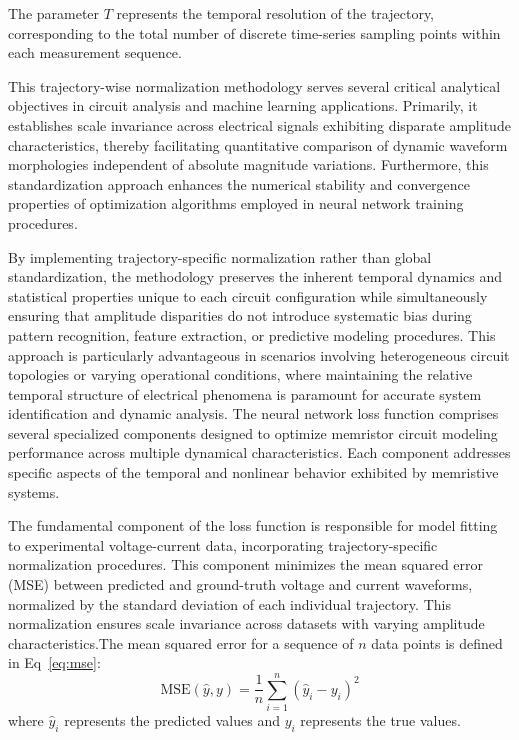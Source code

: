 \documentclass[11pt, oneside]{article}
\begin{document}
The parameter $T$ represents the temporal resolution of the trajectory, corresponding to the total number of discrete time-series sampling points within each measurement sequence.

This trajectory-wise normalization methodology serves several critical analytical objectives in circuit analysis and machine learning applications. Primarily, it establishes scale invariance across electrical signals exhibiting disparate amplitude characteristics, thereby facilitating quantitative comparison of dynamic waveform morphologies independent of absolute magnitude variations. Furthermore, this standardization approach enhances the numerical stability and convergence properties of optimization algorithms employed in neural network training procedures.

By implementing trajectory-specific normalization rather than global standardization, the methodology preserves the inherent temporal dynamics and statistical properties unique to each circuit configuration while simultaneously ensuring that amplitude disparities do not introduce systematic bias during pattern recognition, feature extraction, or predictive modeling procedures. This approach is particularly advantageous in scenarios involving heterogeneous circuit topologies or varying operational conditions, where maintaining the relative temporal structure of electrical phenomena is paramount for accurate system identification and dynamic analysis.
The neural network loss function comprises several specialized components designed to optimize memristor circuit modeling performance across multiple dynamical characteristics. Each component addresses specific aspects of the temporal and nonlinear behavior exhibited by memristive systems.

The fundamental component of the loss function is responsible for model fitting to experimental voltage-current data, incorporating trajectory-specific normalization procedures. This component minimizes the mean squared error (MSE) between predicted and ground-truth voltage and current waveforms, normalized by the standard deviation of each individual trajectory. This normalization ensures scale invariance across datasets with varying amplitude characteristics.The mean squared error for a sequence of $n$ data points is defined in Eq~\eqref{eq:mse}:
\begin{equation}
    \mathrm{MSE}(\hat{y}, y) = \frac{1}{n} \sum_{i=1}^{n} (\hat{y}_i - y_i)^2
    \label{eq:mse}
\end{equation}
where $\hat{y}_i$ represents the predicted values and $y_i$ represents the true values.
\end{document}
